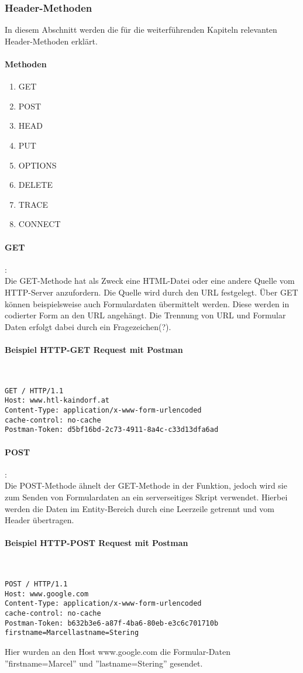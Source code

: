 \subsubsection{Header-Methoden}
In diesem Abschnitt werden die für die weiterführenden Kapiteln relevanten Header-Methoden erklärt.
\paragraph{Methoden}
\begin{enumerate}
\item GET
\item POST
\item HEAD
\item PUT
\item OPTIONS
\item DELETE
\item TRACE
\item CONNECT
\end{enumerate}
\paragraph{GET}:\\Die GET-Methode hat als Zweck eine HTML-Datei oder eine andere Quelle vom HTTP-Server anzufordern. Die Quelle wird durch den URL festgelegt. Über GET können beispielsweise auch Formulardaten übermittelt werden. Diese werden in codierter Form an den URL angehängt. Die Trennung von URL und Formular Daten erfolgt dabei durch ein Fragezeichen(?).
\paragraph{Beispiel HTTP-GET Request mit Postman}\mbox{}\\
\begin{lstlisting}[caption={HTTP GET}]
GET / HTTP/1.1
Host: www.htl-kaindorf.at
Content-Type: application/x-www-form-urlencoded
cache-control: no-cache
Postman-Token: d5bf16bd-2c73-4911-8a4c-c33d13dfa6ad
\end{lstlisting}
\paragraph{POST}:\\Die POST-Methode ähnelt der GET-Methode in der Funktion, jedoch wird sie zum Senden von Formulardaten an ein serverseitiges Skript verwendet. Hierbei werden die Daten im Entity-Bereich durch eine Leerzeile getrennt und vom Header übertragen.
\paragraph{Beispiel HTTP-POST Request mit Postman}\mbox{}\\
\begin{lstlisting}[caption={HTTP POST}]
POST / HTTP/1.1
Host: www.google.com
Content-Type: application/x-www-form-urlencoded
cache-control: no-cache
Postman-Token: b632b3e6-a87f-4ba6-80eb-e3c6c701710b
firstname=Marcellastname=Stering
\end{lstlisting}
Hier wurden an den Host www.google.com die Formular-Daten ''firstname=Marcel'' und ''lastname=Stering'' gesendet.
